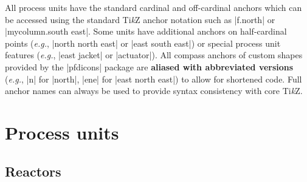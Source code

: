 \documentclass[11pt]{article}
\newcommand\Tikz{Ti\textit{k}Z\xspace}
\begin{document}
All process units have the standard cardinal and off-cardinal anchors which can be accessed using the standard \Tikz anchor notation such as |f.north| or |mycolumn.south east|. Some units have additional anchors on half-cardinal points (\textit{e.g.}, |north north east| or |east south east|) or special process unit features (\textit{e.g.}, |east jacket| or |actuator|). All compass anchors of custom shapes provided by the |pfdicons| package are \textbf{aliased with abbreviated versions} (\textit{e.g.}, |n| for |north|, |ene| for |east north east|) to allow for shortened code. Full anchor names can always be used to provide syntax consistency with core \Tikz.

\section{Process units}
\subsection{Reactors}
\end{document}
